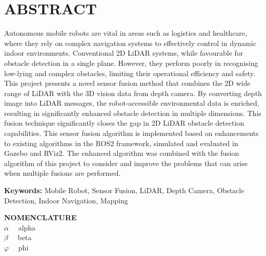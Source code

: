 \section*{ABSTRACT}
\vspace{0.5cm}
Autonomous mobile robots are vital in areas such as logistics and healthcare, where they rely on complex navigation systems to effectively control in dynamic indoor environments. Conventional 2D LiDAR systems, while favourable for obstacle detection in a single plane. However, they perform poorly in recognising low-lying and complex obstacles, limiting their operational efficiency and safety.
This project presents a novel sensor fusion method that combines the 2D wide range of LiDAR with the 3D vision data from depth camera. By converting depth image into LiDAR messages, the robot-accessible environmental data is enriched, resulting in significantly enhanced obstacle detection in multiple dimensions. This fusion technique significantly closes the gap in 2D LiDAR obstacle detection capabilities.
This sensor fusion algorithm is implemented based on enhancements to existing algorithms in the ROS2 framework, simulated and evaluated in Gazebo and RViz2. The enhanced algorithm was combined with the fusion algorithm of this project to consider and improve the problems that can arise when multiple fusions are performed.
\vspace{0.5cm}

\textbf{Keywords:} Mobile Robot, Sensor Fusion, LiDAR, Depth Camera, Obstacle Detection, Indoor Navigation, Mapping

\vspace{0.5cm}
\textbf{NOMENCLATURE}
\\
$\alpha \quad$ alpha
\\
$\beta \quad$ beta
\\
$\varphi \quad$ phi